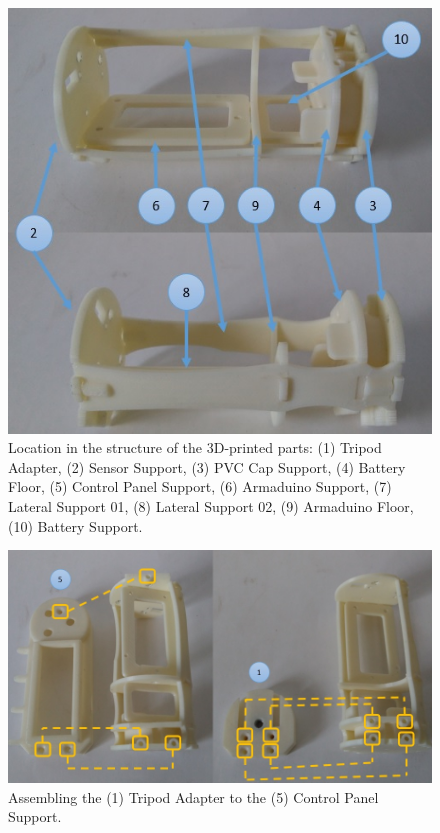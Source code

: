 \documentclass[12pt,letterpaper]{article}
\numberwithin{figure}{section}
\numberwithin{equation}{section}
\numberwithin{table}{section}
\begin{document}
 \begin{figure}[H]
     \centering
     \includegraphics[scale=0.5]{Figuras/figure_26.jpg}
     \caption{Location in the structure of the 3D-printed parts: (1) Tripod Adapter, (2) Sensor Support, (3) PVC Cap Support, (4) Battery Floor, (5) Control Panel Support, (6) Armaduino Support, (7) Lateral Support 01, (8) Lateral Support 02, (9) Armaduino Floor, (10) Battery Support.}
     \label{fig:26}
 \end{figure}

 \begin{figure}[H]
     \centering
     \includegraphics[scale=0.7]{Figuras/figure_27.jpg}
     \caption{Assembling the (1) Tripod Adapter to the (5) Control Panel Support.}
     \label{fig:27}
 \end{figure}
\end{document}
